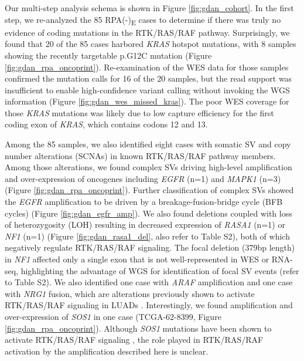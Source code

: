 \documentclass[phd,tocprelim]{cornell}
\begin{document}
Our multi-step analysis schema is shown in Figure \ref{fig:gdan_cohort}. In the first step, we re-analyzed the 85 RPA(-)\textsubscript{E} cases to determine if there was truly no evidence of coding mutations in the RTK/RAS/RAF pathway. Surprisingly, we found that 20 of the 85 cases harbored \textit{KRAS} hotspot mutations, with 8 samples showing the recently targetable p.G12C mutation \cite{Canon2019-aj,Ostrem2013-lt} (Figure \ref{fig:gdan_rpa_oncoprint}). Re-examination of the WES data for those samples confirmed the mutation calls for 16 of the 20 samples, but the read support was insufficient to enable high-confidence variant calling without invoking the WGS information (Figure \ref{fig:gdan_wes_missed_kras}). The poor WES coverage for those \textit{KRAS} mutations was likely due to low capture efficiency \cite{Clark2011-iq} for the first coding exon of \textit{KRAS}, which contains codons 12 and 13. 

Among the 85 samples, we also identified eight cases with somatic SV and copy number alterations (SCNAs) in known RTK/RAS/RAF pathway members. Among those alterations, we found complex SVs driving high-level amplification and over-expression of oncogenes including \textit{EGFR} (n=1) and \textit{MAPK1} (n=3) (Figure \ref{fig:gdan_rpa_oncoprint}). Further classification of complex SVs showed the \textit{EGFR} amplification to be driven by a breakage-fusion-bridge cycle (BFB cycles) (Figure \ref{fig:gdan_egfr_amp}). We also found deletions coupled with loss of heterozygosity (LOH) resulting in decreased expression of \textit{RASA1} (n=1) or \textit{NF1} (n=1) (Figure \ref{fig:gdan_rasa1_del}, also refer to \cite{Carrot-Zhang2020-vl} Table S2), both of which negatively regulate RTK/RAS/RAF signaling. The focal deletion (379bp length) in \textit{NF1} affected only a single exon that is not well-represented in WES or RNA-seq, highlighting the advantage of WGS for identification of focal SV events (refer to \cite{Carrot-Zhang2020-vl} Table S2). We also identified one case with \textit{ARAF} amplification and one case with \textit{NRG1} fusion, which are alterations previously shown to activate RTK/RAS/RAF signaling in LUADs \cite{Fernandez-Cuesta2014-wr,Imielinski2014-ve}. Interestingly, we found amplification and over-expression of \textit{SOS1} in one case (TCGA-62-8399, Figure \ref{fig:gdan_rpa_oncoprint}). Although \textit{SOS1} mutations have been shown to activate RTK/RAS/RAF signaling \cite{Cai2019-tw}, the role played in RTK/RAS/RAF activation by the amplification described here is unclear.
\end{document}
